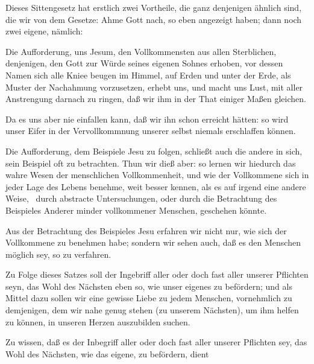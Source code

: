 \begin{aufza}
\begin{aufzb}
\begin{aufzc}
\end{aufzc}
\end{aufzb}
\item {}\par
Dieses Sittengesetz hat erstlich zwei Vortheile, die ganz denjenigen ähnlich sind, die wir von dem Gesetze: Ahme Gott nach, so eben angezeigt haben; dann noch zwei eigene, nämlich:
\begin{aufzb}
\item Die Aufforderung, uns Jesum, den Vollkommensten aus allen Sterblichen, denjenigen, den Gott zur Würde seines eigenen Sohnes erhoben, vor dessen Namen sich alle Kniee beugen im Himmel, auf Erden und unter der Erde, als Muster der Nachahmung vorzusetzen, erhebt uns, und macht uns Lust, mit aller Anstrengung darnach zu ringen, daß wir ihm in der That einiger Maßen gleichen.
\item Da es uns aber nie einfallen kann, daß wir ihn schon erreicht hätten: so wird unser Eifer in der Vervollkommnung unserer selbst niemals erschlaffen können.
\item Die Aufforderung, dem Beispiele Jesu zu folgen, schließt auch die andere in sich, sein Beispiel oft zu betrachten. Thun wir dieß aber: so lernen wir hiedurch das wahre Wesen der menschlichen Vollkommenheit, und wie der Vollkommene sich in jeder Lage des Lebens benehme, weit besser kennen, als es auf irgend eine andere Weise, \zB\  durch abstracte Untersuchungen, oder durch die Betrachtung des Beispieles Anderer minder vollkommener Menschen, geschehen könnte.
\item Aus der Betrachtung des Beispieles Jesu erfahren wir nicht nur, wie sich der Vollkommene zu benehmen habe; sondern wir sehen auch, daß es den Menschen möglich sey, so zu verfahren.
\end{aufzb}
\item {}\par
Zu Folge dieses Satzes soll der Ingebriff aller oder doch fast aller unserer Pflichten seyn, das Wohl des Nächsten eben so, wie unser eigenes zu befördern; und als Mittel dazu sollen wir eine gewisse Liebe zu jedem Menschen, vornehmlich zu demjenigen, dem wir nahe genug stehen (zu unserem Nächsten), um ihm helfen zu können, in unseren Herzen auszubilden suchen.
\begin{aufzb}
\item Zu wissen, daß es der Inbegriff aller oder doch fast aller unserer Pflichten sey, das Wohl des Nächsten, wie das eigene, zu befördern, dient

\end{aufzb}
\end{aufza}
